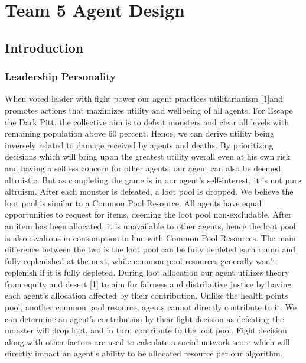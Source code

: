 \useunder{\uline}{\ul}{}
\chapter{Team 5 Agent Design}\label{team_5_agent_design}
\section{Introduction}
\subsection{Leadership Personality}
\noindent When voted leader with fight power our agent practices utilitarianism [1]and promotes actions that maximizes utility and wellbeing of all agents. For Escape the Dark Pitt, the collective aim is to defeat monsters and clear all levels with remaining population above 60 percent. Hence, we can derive utility being inversely related to damage received by agents and deaths. By prioritizing decisions which will bring upon the greatest utility overall even at his own risk and having a selfless concern for other agents, our agent can also be deemed altruistic. But as completing the game is in our agent’s self-interest, it is not pure altruism.
\medskip
\noindent After each monster is defeated, a loot pool is dropped. We believe the loot pool is similar to a Common Pool Resource. All agents have equal opportunities to request for items, deeming the loot pool non-excludable. After an item has been allocated, it is unavailable to other agents, hence the loot pool is also rivalrous in consumption in line with Common Pool Resources. The main difference between the two is the loot pool can be fully depleted each round and fully replenished at the next, while common pool resources generally won’t replenish if it is fully depleted. During loot allocation our agent utilizes theory from equity and desert [1] to aim for fairness and distributive justice by having each agent’s allocation affected by their contribution. Unlike the health points pool, another common pool resource, agents cannot directly contribute to it. We can determine an agent’s contribution by their fight decision as defeating the monster will drop loot, and in turn contribute to the loot pool. Fight decision along with other factors are used to calculate a social network score which will directly impact an agent’s ability to be allocated resource per our algorithm.


